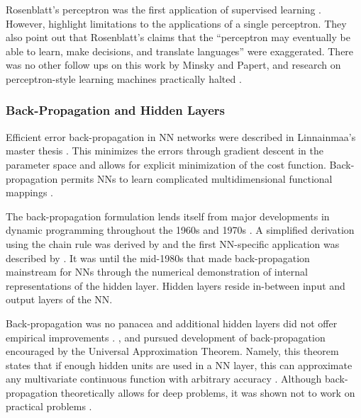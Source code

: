 Rosenblatt’s perceptron was the first application of supervised learning \citep{Russell2008}. However, \citet{Minsky1969} highlight limitations to the applications of a single perceptron. They also point out that Rosenblatt’s claims that the ``perceptron may eventually be able to learn, make decisions, and translate languages'' were exaggerated. There was no other follow ups on this work by Minsky and Papert, and research on perceptron-style learning machines practically halted \citep{Minsky2017}. 

\subsubsection{Back-Propagation and Hidden Layers}
Efficient error back-propagation in NN networks were described in Linnainmaa’s master thesis \citep{Linnainmaa1970}. This minimizes the errors through gradient descent in the parameter space \citep{Hadamard1907} and allows for explicit minimization of the cost function. Back-propagation permits \acp{NN} to learn complicated multidimensional functional mappings \citep{Dreyfus1973}. 

The back-propagation formulation lends itself from major developments in dynamic programming throughout the 1960s and 1970s \citep{Kelley1960, Bryson1961, Linnainmaa1976}. A simplified derivation using the chain rule was derived by \cite{Dreyfus1973} and the first NN-specific application was described by \cite{Werbos81}. It was until the mid-1980s that \cite{Rumelhart1986} made back-propagation mainstream for \acp{NN} through the numerical demonstration of internal representations of the hidden layer. Hidden layers reside in-between input and output layers of the NN.

Back-propagation was no panacea and additional hidden layers did not offer empirical improvements \citep{Schmidhuber2015}. \cite{Kolmogoro1956}, \cite{Hecht-Nielsen1989} and \cite{Hornik1989} pursued development of back-propagation encouraged by the Universal Approximation Theorem. Namely, this theorem states that if enough hidden units are used in a NN layer, this can approximate any multivariate continuous function with arbitrary accuracy \citep{Hecht-Nielsen1989}.
Although back-propagation theoretically allows for deep problems, it was shown not to work on practical problems \citep{Schmidhuber2015}.

